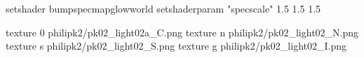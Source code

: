 setshader bumpspecmapglowworld
setshaderparam "specscale" 1.5 1.5 1.5


texture 0 philipk2/pk02_light02a_C.png
texture n philipk2/pk02_light02_N.png
texture s philipk2/pk02_light02_S.png
texture g philipk2/pk02_light02_I.png

